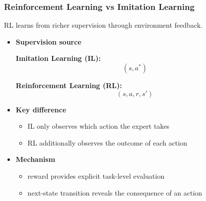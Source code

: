 \documentclass[11pt,aspectratio=169,xcolor={dvipsnames},usepdftitle=false]{beamer}
\begin{document}
\begin{frame}
\frametitle{Reinforcement Learning vs Imitation Learning}

RL learns from richer supervision through environment feedback.

\begin{itemize}

	\item \textbf{Supervision source}

	\textbf{Imitation Learning (IL):}
	\vspace{-1.0em}
	$$
	(s, a^*)
	$$

	\textbf{Reinforcement Learning (RL):}
	\vspace{-1.0em}
	$$
	(s, a, r, s')
	$$

	\item \textbf{Key difference}

	\begin{itemize}
		\item IL only observes which action the expert takes
		\item RL additionally observes the outcome of each action
	\end{itemize}

	\item \textbf{Mechanism}

	\begin{itemize}
		\item reward provides explicit task-level evaluation
		\item next-state transition reveals the consequence of an action
	\end{itemize}

\end{itemize}

\end{frame}
\end{document}
